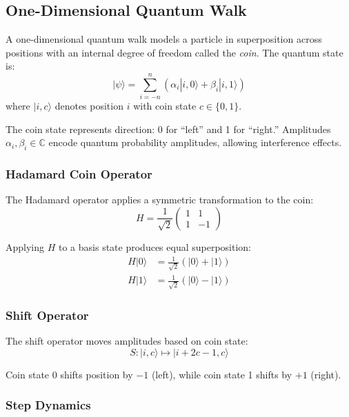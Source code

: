 \documentclass[12pt,a4paper]{article}
\begin{document}
\subsection{One-Dimensional Quantum Walk}

A one-dimensional quantum walk models a particle in superposition across positions with an internal degree of freedom called the \textit{coin}. The quantum state is:
\begin{equation}
|\psi\rangle = \sum_{i=-n}^{n} \left( \alpha_i |i, 0\rangle + \beta_i |i, 1\rangle \right)
\end{equation}
where $|i, c\rangle$ denotes position $i$ with coin state $c \in \{0, 1\}$.

The coin state represents direction: 0 for ``left'' and 1 for ``right.'' Amplitudes $\alpha_i, \beta_i \in \mathbb{C}$ encode quantum probability amplitudes, allowing interference effects.

\subsubsection{Hadamard Coin Operator}

The Hadamard operator applies a symmetric transformation to the coin:
\begin{equation}
H = \frac{1}{\sqrt{2}} \begin{pmatrix} 1 & 1 \\ 1 & -1 \end{pmatrix}
\end{equation}

Applying $H$ to a basis state produces equal superposition:
\begin{align}
H |0\rangle &= \frac{1}{\sqrt{2}}(|0\rangle + |1\rangle) \\
H |1\rangle &= \frac{1}{\sqrt{2}}(|0\rangle - |1\rangle)
\end{align}

\subsubsection{Shift Operator}

The shift operator moves amplitudes based on coin state:
\begin{equation}
S: |i, c\rangle \mapsto |i + 2c - 1, c\rangle
\end{equation}

Coin state 0 shifts position by $-1$ (left), while coin state 1 shifts by $+1$ (right).

\subsubsection{Step Dynamics}
\end{document}
